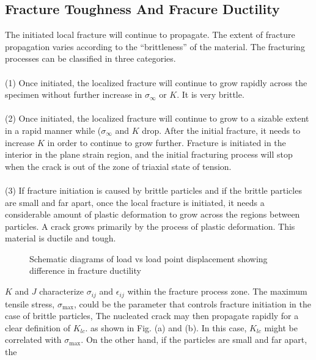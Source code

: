 \documentclass[12pt]{article}
\begin{document}
\subsection{Fracture Toughness And Fracure Ductility}
The initiated local fracture will continue to propagate. The extent of fracture propagation varies
according to the “brittleness” of the material. The fracturing processes can be classified in three
categories.\\\\
(1) Once initiated, the localized fracture will continue to grow rapidly across the specimen without
further increase in $\sigma_\infty$ or $K$. It is very brittle.\\\\
(2) Once initiated, the localized fracture will continue to grow to a sizable extent in a rapid manner
while ($\sigma_\infty$ and $K$ drop. After the initial fracture, it needs to increase $K$ in order to continue to grow
further.
Fracture is initiated in the interior in the plane strain region, and the initial fracturing process will
stop when the crack is out of the zone of triaxial state of tension.
\\\\
(3) If fracture initiation is caused by brittle particles and if the brittle particles are small and far
apart, once the local fracture is initiated, it needs a considerable amount of plastic deformation to grow
across the regions between particles. A crack grows primarily by the process of plastic deformation.
This material is ductile and tough.
\begin{figure}[H]
    \centering
    \captionsetup{labelformat=empty}
    \caption{Schematic diagrams of load vs load point displacement showing difference in fracture ductility}
\end{figure}
$K$ and $J$ characterize $\sigma_{ij}$ and $\epsilon_{ij}$ within the fracture process zone. The maximum tensile stress, $\sigma_{\text{max}}$,
could be the parameter that controls fracture initiation in the case of brittle particles, The nucleated
crack may then propagate rapidly for a clear definition of $K_{lc}$. as shown in Fig. (a) and (b). In this
case, $K_{lc}$ might be correlated with $\sigma_{\text{max}}$. On the other hand, if the particles are small and far apart, the
\end{document}
